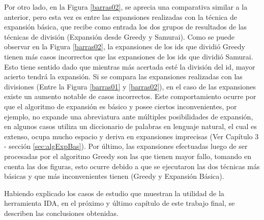 Por otro lado, en la Figura \ref{barras02}, se aprecia una comparativa similar a la anterior, pero esta vez es entre las expansiones realizadas con la técnica de expansión básica, que recibe como entrada los dos grupos de resultados de las técnicas de división (Expansión desde Greedy y Samurai). Como se puede observar en la Figura \ref{barras02}, la expansiones de los ids que dividió Greedy tienen más casos incorrectos que las expansiones de los ids que dividió Samurai. Esto tiene sentido dado que mientras más acertada esté la división del id, mayor acierto tendrá la expansión. Si se compara las expansiones realizadas con las divisiones (Entre la Figura \ref{barras01} y \ref{barras02}), en el caso de las expansiones existe un aumento notable de casos incorrectos. 
Este comportamiento ocurre por que el algoritmo de expansión es básico y posee ciertos inconvenientes, por ejemplo, no expande una abreviatura ante múltiples posibilidades de expansión, en algunos casos utiliza un diccionario de palabras en lenguaje natural, el cual es extenso, ocupa mucho espacio y deriva en expansiones imprecisas (Ver Capítulo 3 - sección \ref{sec:algExpBas}).
Por último, las expansiones efectuadas luego de ser procesadas por el algoritmo Greedy son las que tienen mayor fallo, tomando en cuenta las dos figuras, esto ocurre debido a que se ejecutaron las dos técnicas más básicas y que más inconvenientes tienen (Greedy y Expansión Básica).

\enlargethispage{\baselineskip}
\enlargethispage{\baselineskip}%

Habiendo explicado los casos de estudio que muestran la utilidad de la herramienta IDA, en el próximo y último capítulo de este trabajo final, se describen las conclusiones obtenidas.